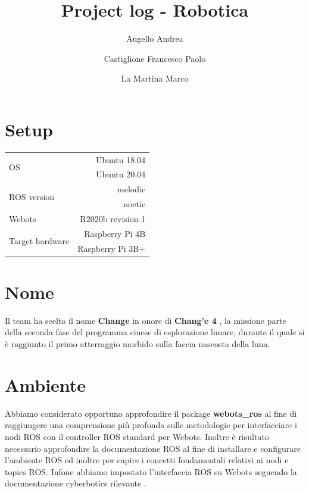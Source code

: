 \documentclass[a4paper]{article}
\begin{document}
	\title{Project log - Robotica}
	\author{Augello Andrea \and Castiglione Francesco Paolo \and La Martina Marco}
	\maketitle
	\tableofcontents

	\section{Setup}\label{sec:Setup}
	\begin{tabular}{|l|r|}
		\hline
		\multirow{2}{4em}{OS} & Ubuntu 18.04 \\
							  & Ubuntu 20.04 \\ \hline
		\multirow{2}{6em}{ROS version} & melodic \\
									   & noetic \\ \hline
		Webots & R2020b revision 1\\ \hline
		\multirow{2}{11em}{Target hardware} & Raspberry Pi 4B \\
											& Raspberry Pi 3B+ \\ \hline
	\end{tabular}

	\section{Nome}\label{sec:Name}
	Il team ha scelto il nome \textbf{Change} in onore di \textbf{Chang'e 4} \cite{change4}, la missione parte della seconda fase del programma cinese di esplorazione lunare, durante il quale si è raggiunto il primo atterraggio morbido sulla faccia nascosta della luna. 

	\section{Ambiente}\label{sec:Libraries}
	Abbiamo considerato opportuno approfondire il package \textbf{webots\_ros} \cite{webotsRos} al fine di raggiungere una comprensione più profonda sulle metodologie per interfacciare i nodi ROS con il controller ROS standard per Webots. Inoltre è risultato necessario approfondire la documentazione ROS \cite{rosTutorial} al fine di installare e configurare l'ambiente ROS ed inoltre per capire i concetti fondamentali relativi ai nodi e topics ROS. Infone abbiamo impostato l'interfaccia ROS su Webots seguendo la documentazione cyberbotics rilevante \cite{rosTutorial}.
	
\end{document}
